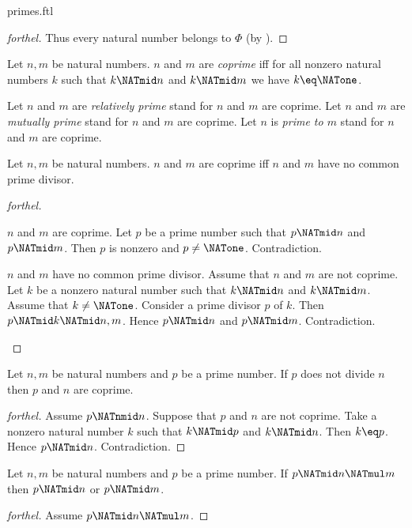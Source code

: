 \documentclass{naproche-library}
\begin{document}
\begin{smodule}[title=Prime Numbers]{primes.ftl}
\begin{proof}[forthel]
  Thus every natural number belongs to $\Phi$ (by ).
\end{proof}

\begin{definition}[forthel,id=ARITHMETIC_10_463197419077632]
  Let $n, m$ be natural numbers.
  $n$ and $m$ are \emph{coprime} iff for all nonzero natural numbers $k$ such that $k \NATmid n$ and $k \NATmid m$ we have $k \eq \NATone$.

  Let $n$ and $m$ are \emph{relatively prime} stand for $n$ and $m$ are coprime.
  Let $n$ and $m$ are \emph{mutually prime} stand for $n$ and $m$ are coprime.
  Let $n$ is \emph{prime to $m$} stand for $n$ and $m$ are coprime.
\end{definition}

\begin{proposition}[forthel,id=ARITHMETIC_10_5776394594287616]
  Let $n, m$ be natural numbers.
  $n$ and $m$ are coprime iff $n$ and $m$ have no common prime divisor.
\end{proposition}
\begin{proof}[forthel]
  \begin{case}{$n$ and $m$ are coprime.}
    Let $p$ be a prime number such that $p \NATmid n$ and $p \NATmid m$.
    Then $p$ is nonzero and $p \neq \NATone$.
    Contradiction.
  \end{case}

  \begin{case}{$n$ and $m$ have no common prime divisor.}
    Assume that $n$ and $m$ are not coprime.
    Let $k$ be a nonzero natural number such that $k \NATmid n$ and $k \NATmid m$.
    Assume that $k \neq \NATone$.
    Consider a prime divisor $p$ of $k$.
    Then $p \NATmid k \NATmid n,m$.
    Hence $p \NATmid n$ and $p \NATmid m$.
    Contradiction.
  \end{case}
\end{proof}

\begin{proposition}[forthel,id=ARITHMETIC_10_7212152851005440]
  Let $n, m$ be natural numbers and $p$ be a prime number.
  If $p$ does not divide $n$ then $p$ and $n$ are coprime.
\end{proposition}
\begin{proof}[forthel]
  Assume $p \NATnmid n$.
  Suppose that $p$ and $n$ are not coprime.
  Take a nonzero natural number $k$ such that $k \NATmid p$ and $k \NATmid n$.
  Then $k \eq p$.
  Hence $p \NATmid n$.
  Contradiction.
\end{proof}
\inlineforthel{[quit]}
\begin{proposition}[forthel,id=ARITHMETIC_10_8313676557713408]
  Let $n, m$ be natural numbers and $p$ be a prime number.
  If $p \NATmid n \NATmul m$ then $p \NATmid n$ or $p \NATmid m$.
\end{proposition}
\begin{proof}[forthel]
  Assume $p \NATmid n \NATmul m$.


\end{proof}
\end{smodule}
\end{document}
